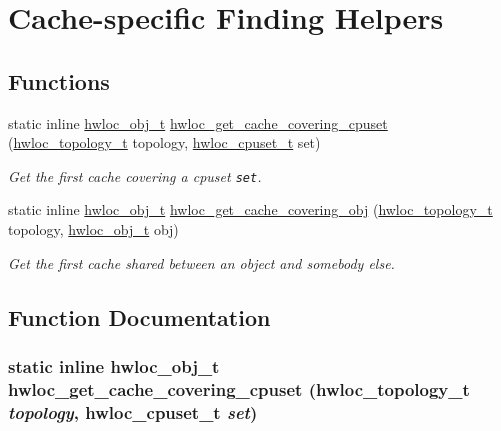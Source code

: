 \hypertarget{group__hwlocality__helper__find__cache}{
\section{Cache-specific Finding Helpers}
\label{group__hwlocality__helper__find__cache}
}
\subsection*{Functions}
\begin{CompactItemize}
\item 
static inline \hyperlink{structhwloc__obj}{hwloc\_\-obj\_\-t} \hyperlink{group__hwlocality__helper__find__cache_g5e56e841b6887dc596214965d379781e}{hwloc\_\-get\_\-cache\_\-covering\_\-cpuset} (\hyperlink{group__hwlocality__topology_g9d1e76ee15a7dee158b786c30b6a6e38}{hwloc\_\-topology\_\-t} topology, \hyperlink{group__hwlocality__cpuset_g82e51d695c430832b703dad5ab8d75e4}{hwloc\_\-cpuset\_\-t} set)
\begin{CompactList}\small\item\em Get the first cache covering a cpuset {\tt set}. \item\end{CompactList}\item 
static inline \hyperlink{structhwloc__obj}{hwloc\_\-obj\_\-t} \hyperlink{group__hwlocality__helper__find__cache_gfdb27db8cae6b97c7e4271844e1ba986}{hwloc\_\-get\_\-cache\_\-covering\_\-obj} (\hyperlink{group__hwlocality__topology_g9d1e76ee15a7dee158b786c30b6a6e38}{hwloc\_\-topology\_\-t} topology, \hyperlink{structhwloc__obj}{hwloc\_\-obj\_\-t} obj)
\begin{CompactList}\small\item\em Get the first cache shared between an object and somebody else. \item\end{CompactList}\end{CompactItemize}


\subsection{Function Documentation}
\hypertarget{group__hwlocality__helper__find__cache_g5e56e841b6887dc596214965d379781e}{
\subsubsection[{hwloc\_\-get\_\-cache\_\-covering\_\-cpuset}]{\setlength{\rightskip}{0pt plus 5cm}static inline {\bf hwloc\_\-obj\_\-t} hwloc\_\-get\_\-cache\_\-covering\_\-cpuset ({\bf hwloc\_\-topology\_\-t} {\em topology}, \/  {\bf hwloc\_\-cpuset\_\-t} {\em set})}}
\label{group__hwlocality__helper__find__cache_g5e56e841b6887dc596214965d379781e}


